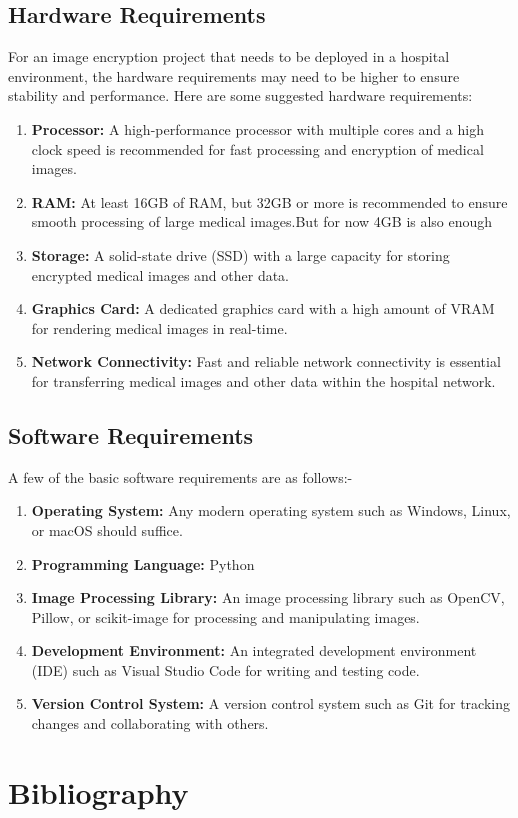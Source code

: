 \documentclass[11pt,a4paper,english]{article}
\begin{document}
\subsection[short]{Hardware Requirements}
For an image encryption project that needs to be deployed in a hospital environment, the hardware requirements may need to be higher to ensure stability and performance. Here are some suggested hardware requirements:
\begin{enumerate}
    \item \textbf{Processor:} A high-performance processor with multiple cores and a high clock speed is recommended for fast processing and encryption of medical images.

    \item \textbf{RAM:} At least 16GB of RAM, but 32GB or more is recommended to ensure smooth processing of large medical images.But for now 4GB is also enough

    \item \textbf{Storage:} A solid-state drive (SSD) with a large capacity for storing encrypted medical images and other data.

    \item \textbf{Graphics Card:} A dedicated graphics card with a high amount of VRAM for rendering medical images in real-time.

    \item \textbf{Network Connectivity:} Fast and reliable network connectivity is essential for transferring medical images and other data within the hospital network.
\end{enumerate}
\subsection[short]{Software Requirements}
A few of the basic software requirements are as follows:-
\begin{enumerate}
    \item \textbf{Operating System:} Any modern operating system such as Windows, Linux, or macOS should suffice.

    \item \textbf{Programming Language:} Python

    \item \textbf{Image Processing Library:} An image processing library such as OpenCV, Pillow, or scikit-image for processing and manipulating images.

    \item \textbf{Development Environment:} An integrated development environment (IDE) such as Visual Studio Code for writing and testing code.

    \item \textbf{Version Control System:} A version control system such as Git for tracking changes and collaborating with others.

\end{enumerate}
\newpage
\section{Bibliography}

\nocite{*}
\end{document}
